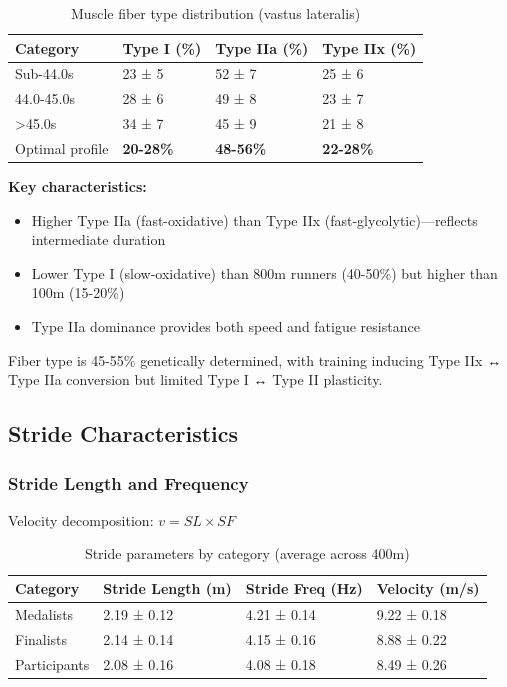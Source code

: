 \begin{table}[H]
\centering
\caption{Muscle fiber type distribution (vastus lateralis)}
\begin{tabular}{@{}llll@{}}
\toprule
\textbf{Category} & \textbf{Type I (\%)} & \textbf{Type IIa (\%)} & \textbf{Type IIx (\%)} \\
\midrule
Sub-44.0s & 23 ± 5 & 52 ± 7 & 25 ± 6 \\
44.0-45.0s & 28 ± 6 & 49 ± 8 & 23 ± 7 \\
>45.0s & 34 ± 7 & 45 ± 9 & 21 ± 8 \\
\midrule
Optimal profile & \textbf{20-28\%} & \textbf{48-56\%} & \textbf{22-28\%} \\
\bottomrule
\end{tabular}
\end{table}

\textbf{Key characteristics:}
\begin{itemize}
    \item Higher Type IIa (fast-oxidative) than Type IIx (fast-glycolytic)—reflects intermediate duration
    \item Lower Type I (slow-oxidative) than 800m runners (40-50\%) but higher than 100m (15-20\%)
    \item Type IIa dominance provides both speed and fatigue resistance
\end{itemize}

Fiber type is 45-55\% genetically determined, with training inducing Type IIx ↔ Type IIa conversion but limited Type I ↔ Type II plasticity.

\subsection{Stride Characteristics}

\subsubsection{Stride Length and Frequency}

Velocity decomposition: $v = SL \times SF$

\begin{table}[H]
\centering
\caption{Stride parameters by category (average across 400m)}
\begin{tabular}{@{}llll@{}}
\toprule
\textbf{Category} & \textbf{Stride Length (m)} & \textbf{Stride Freq (Hz)} & \textbf{Velocity (m/s)} \\
\midrule
Medalists & 2.19 ± 0.12 & 4.21 ± 0.14 & 9.22 ± 0.18 \\
Finalists & 2.14 ± 0.14 & 4.15 ± 0.16 & 8.88 ± 0.22 \\
Participants & 2.08 ± 0.16 & 4.08 ± 0.18 & 8.49 ± 0.26 \\
\bottomrule
\end{tabular}
\end{table}

